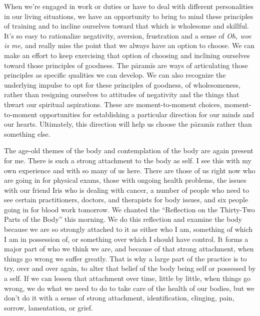 When we're engaged in work or duties or have to deal with different 
personalities in our living situations, we have an opportunity to bring 
to mind these principles of training and to incline ourselves toward 
that which is wholesome and skillful. It's so easy to rationalize 
negativity, aversion, frustration and a sense of \emph{Oh, woe is me,} 
and really miss the point that we always have an option to choose. We 
can make an effort to keep exercising that option of choosing and 
inclining ourselves toward those principles of goodness. The pāramīs 
are ways of articulating those principles as specific qualities we can 
develop. We can also recognize the underlying impulse to opt for these 
principles of goodness, of wholesomeness, rather than resigning 
ourselves to attitudes of negativity and the things that thwart our 
spiritual aspirations. These are moment-to-moment choices, 
moment-to-moment opportunities for establishing a particular direction 
for our minds and our hearts. Ultimately, this direction will help us 
choose the pāramīs rather than something else.


The age-old themes of the body and contemplation of the body are again 
present for me. There is such a strong attachment to the body as self. 
I see this with my own experience and with so many of us here. There 
are those of us right now who are going in for physical exams, those 
with ongoing health problems, the issues with our friend Iris who is 
dealing with cancer, a number of people who need to see certain 
practitioners, doctors, and therapists for body issues, and six people 
going in for blood work tomorrow. We chanted the ``Reflection on the 
Thirty-Two Parts of the Body'' this morning. We do this reflection and 
examine the body because we are so strongly attached to it as either 
who I am, something of which I am in possession of, or something over 
which I should have control. It forms a major part of who we think we 
are, and because of that strong attachment, when things go wrong we 
suffer greatly. That is why a large part of the practice is to try, 
over and over again, to alter that belief of the body being self or 
possessed by a self. If we can lessen that attachment over time, little 
by little, when things go wrong, we do what we need to do to take care 
of the health of our bodies, but we don't do it with a sense of strong 
attachment, identification, clinging, pain, sorrow, lamentation, or 
grief.

